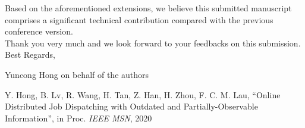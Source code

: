 \documentclass[10pt,draftclsnofoot,onecolumn]{article}
\begin{document}
\begin{enumerate}
\end{enumerate}

Based on the aforementioned extensions, we believe this submitted manuscript comprises a significant technical contribution compared with the previous conference version.\\

Thank you very much and we look forward to your feedbacks on this submission.\\

Best Regards,

Yuncong Hong on behalf of the authors
\vspace{+20mm}

\noindent [1] Y. Hong, B. Lv, R. Wang, H. Tan, Z. Han, H. Zhou, F. C. M. Lau, ``Online Distributed Job Dispatching with Outdated and Partially-Observable Information'', in Proc. \emph{IEEE MSN}, 2020\\
\end{document}
